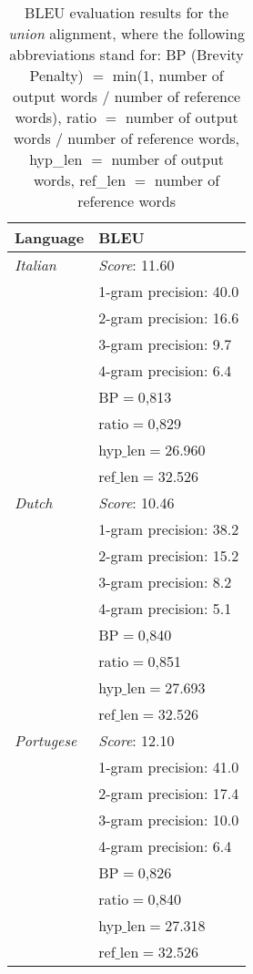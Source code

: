 \documentclass[11pt]{article}
\begin{document}
\begin{itemize}
\begin{center}
    \begin{table}
    \begin{tabular}{ | l | l |}
    \hline
    \textbf{Language} & \textbf{BLEU} \\ 
    \hline
    \textit{Italian} & \textit{Score}: 11.60 \\
    & 1-gram precision: 40.0 \\
    & 2-gram precision: 16.6 \\
    & 3-gram precision: 9.7 \\
    & 4-gram precision: 6.4 \\
    & BP$=$0,813 \\
    & ratio$=$0,829 \\
    & hyp$\_$len$=$26.960 \\
    & ref$\_$len$=$32.526\\
    \hline
    \textit{Dutch} & \textit{Score}: 10.46 \\
    & 1-gram precision: 38.2 \\
    & 2-gram precision: 15.2 \\
    & 3-gram precision: 8.2 \\
    & 4-gram precision: 5.1 \\
    & BP$=$0,840 \\
    & ratio$=$0,851 \\
    & hyp$\_$len$=$27.693 \\
    & ref$\_$len$=$32.526\\
    \hline
    \textit{Portugese} & \textit{Score}: 12.10 \\
    & 1-gram precision: 41.0 \\
    & 2-gram precision: 17.4 \\
    & 3-gram precision: 10.0 \\
    & 4-gram precision: 6.4 \\
    & BP$=$0,826 \\
    & ratio$=$0,840 \\
    & hyp$\_$len$=$27.318 \\
    & ref$\_$len$=$32.526\\
    \hline
    \end{tabular}
    \caption{BLEU evaluation results for the \textit{union} alignment, where the following abbreviations stand for: BP (Brevity Penalty) $=$ min(1, number of output words $/$ number of reference words), ratio $=$ number of output words $/$ number of reference words, hyp\_len $=$ number of output words, ref\_len $=$ number of reference words }
    \label{bleuUnion}
    \end{table}
\end{center}


\end{itemize}
\end{document}
